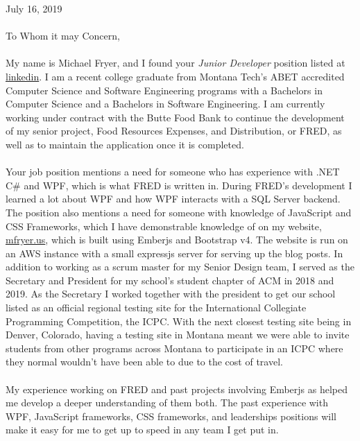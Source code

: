 July 16, 2019\\
\mbox{}\\

To Whom it may Concern,
\paragraph{}
My name is Michael Fryer, and I found your \textit{Junior Developer} position listed at \href{https://www.linkedin.com/jobs/view/1334202574/?refId=5c098f22-0d82-4248-882b-ecd249dd6353&trk=flagship3_search_srp_jobs}{linkedin}. I am a recent college graduate from Montana Tech's ABET accredited Computer Science and Software Engineering programs with a Bachelors in Computer Science and a Bachelors in Software Engineering. I am currently working under contract with the Butte Food Bank to continue the development of my senior project, Food Resources Expenses, and Distribution, or FRED, as well as to maintain the application once it is completed.\\

\paragraph{}
Your job position mentions a need for someone who has experience with .NET C\# and WPF, which is what FRED is written in. During FRED's development I learned a lot about WPF and how WPF interacts with a SQL Server backend. The position also mentions a need for someone with knowledge of JavaScript and CSS Frameworks, which I have demonstrable knowledge of on my website, \href{http://mfryer.us}{mfryer.us}, which is built using Emberjs and Bootstrap v4. The website is run on an AWS instance with a small expressjs server for serving up the blog posts. In addition to working as a scrum master for my Senior Design team, I served as the Secretary and President for my school's student chapter of ACM in 2018 and 2019. As the Secretary I worked together with the president to get our school listed as an official regional testing site for the International Collegiate Programming Competition, the ICPC. With the next closest testing site being in Denver, Colorado, having a testing site in Montana meant we were able to invite students from other programs across Montana to participate in an ICPC where they normal wouldn't have been able to due to the cost of travel.

\paragraph{}
My experience working on FRED and past projects involving Emberjs as helped me develop a deeper understanding of them both. The past experience with WPF, JavaScript frameworks, CSS frameworks, and leaderships positions will make it easy for me to get up to speed in any team I get put in.